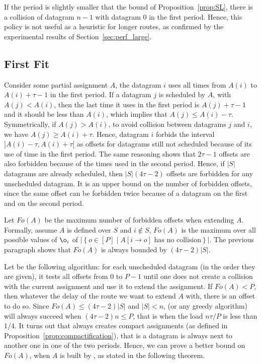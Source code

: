
      If the period is slightly smaller that the bound of Proposition~\ref{prop:SL}, there is a collision of datagram $n-1$ with datagram $0$ in the first period. Hence, this policy is not useful as a heuristic for longer routes, as confirmed by the experimental results of Section~\ref{sec:perf_large}. 

\subsection{First Fit}

 Consider some partial assignment $A$, the datagram $i$ uses all times from $A(i)$ to $A(i) + \tau -1$ in the first period. If a datagram $j$ is scheduled by $A$, with $A(j) < A(i)$, then the last time it uses in the first period is $A(j)+\tau-1$ and it should be less than $A(i)$, which implies that $A(j) \leq A(i) - \tau$. Symmetrically, if $A(j) > A(i)$, to avoid collision between datagrams $j$ and $i$, we have $A(j) \geq A(i) + \tau$. Hence, datagram $i$ forbids the interval $]A(i) - \tau, A(i) + \tau[$ as offsets for datagrams still not scheduled because of its use of time in the first period. The same reasoning shows that $2\tau -1$ offsets are also forbidden because of the times used in the second period. Hence, if $|S|$ datagrams are already scheduled, then $|S|(4\tau -2)$ offsets are forbidden for any unscheduled datagram. It is an upper bound on the number of forbidden offsets, since the same offset can be forbidden twice because of a datagram on the first and on the second period.

Let $Fo(A)$ be the maximum number of forbidden offsets when extending $A$. Formally, assume $A$ is defined over $S$ and $i\notin S$, $Fo(A)$ is the maximum over all possible values of $\o_i$ of $|\left\{ o \in [P] \mid A[i \rightarrow o] \text{ has no collision}\right\}|$. The previous paragraph shows that $Fo(A)$ is always bounded by $(4 \tau -2)|S|$. 



Let \firstfit be the following algorithm:  for each unscheduled datagram (in the order they are given), it tests all offsets from $0$ to $P-1$ until one does not create a collision with the current assignment and use it to extend the assignment. If $Fo(A) < P$, then whatever the delay of the route we want to extend $A$ with, there is an offset to do so. Since $Fo(A) \leq (4 \tau -2)|S|$ and $|S| < n$, \firstfit (or any greedy algorithm) will always succeed when $(4 \tau -2)n \leq P$, that is when the load $ n\tau /P$ is less than $1/4$.
It turns out that \firstfit always creates compact assignments (as defined in Proposition~\ref{prop:compactification}), that is a datagram is always next to another one in one of the two periods. Hence, we can prove a better bound on $Fo(A)$, when $A$ is built by \firstfit, as stated in the following theorem.

